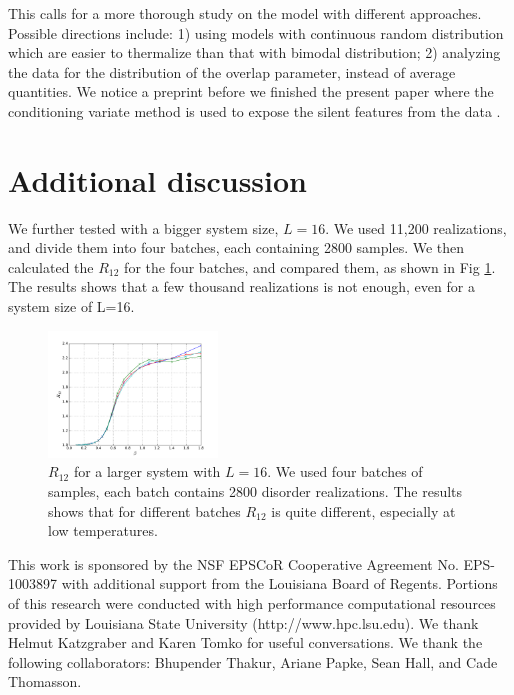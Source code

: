 \documentclass[aps,prb,twocolumn,showpacs,superscriptaddress]{revtex4}
\begin{document}
This calls for a more thorough study on the model with different approaches.
Possible directions include: 1) using models with continuous random distribution which are 
easier to thermalize than that with bimodal distribution; 2) analyzing the
data for the distribution of the overlap parameter, instead of average quantities. We notice a preprint before
we finished the present paper where the conditioning variate method
is used to expose the silent features from the data \cite{Baity-Jesi-etal-2014}. 


\appendix
\section{Additional discussion}

We further tested with a bigger system size, $L=16$. We used 11,200 realizations,
and divide them into four batches, each containing 2800 samples. We then calculated
the $R_{12}$ for the four batches, and compared them, as shown in Fig \ref{fig:l16_r12}. 
The results shows that a few thousand realizations is not enough, even for a 
system size of L=16. 


\begin{figure}[ht]
  \centering
  \includegraphics[width=0.4\textwidth]{img/l16_r12.pdf}
  \caption{$R_{12}$ for a larger system with $L=16$. We used four batches of samples,
each batch contains 2800 disorder realizations. The results shows that for
different batches $R_{12}$ is quite different, especially at low temperatures.
}
\label{fig:l16_r12}
\end{figure}


This work is sponsored by the NSF EPSCoR Cooperative Agreement No. EPS-1003897 with additional support 
from the Louisiana Board of Regents. Portions of this research were conducted with high performance computational resources provided by 
Louisiana State University (http://www.hpc.lsu.edu). We thank Helmut Katzgraber and Karen 
Tomko for useful conversations. We thank the following collaborators: Bhupender Thakur, Ariane Papke, Sean Hall, and Cade Thomasson. 


\end{document}
